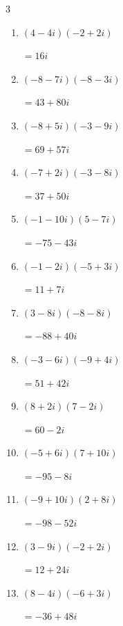 \begin{multicols}{3}
\begin{enumerate}
  \item $\displaystyle (4-4i)(-2+2i)$

        $\displaystyle =16i$

  \item $\displaystyle (-8-7i)(-8-3i)$

        $\displaystyle =43+80i$

  \item $\displaystyle (-8+5i)(-3-9i)$

        $\displaystyle =69+57i$

  \item $\displaystyle (-7+2i)(-3-8i)$

        $\displaystyle =37+50i$

  \item $\displaystyle (-1-10i)(5-7i)$

        $\displaystyle =-75-43i$

  \item $\displaystyle (-1-2i)(-5+3i)$

        $\displaystyle =11+7i$

  \item $\displaystyle (3-8i)(-8-8i)$

        $\displaystyle =-88+40i$

  \item $\displaystyle (-3-6i)(-9+4i)$

        $\displaystyle =51+42i$

  \item $\displaystyle (8+2i)(7-2i)$

        $\displaystyle =60-2i$

  \item $\displaystyle (-5+6i)(7+10i)$

        $\displaystyle =-95-8i$

  \item $\displaystyle (-9+10i)(2+8i)$

        $\displaystyle =-98-52i$

  \item $\displaystyle (3-9i)(-2+2i)$

        $\displaystyle =12+24i$

  \item $\displaystyle (8-4i)(-6+3i)$

        $\displaystyle =-36+48i$

\columnbreak %

\resetques


\end{enumerate}
\end{multicols}
